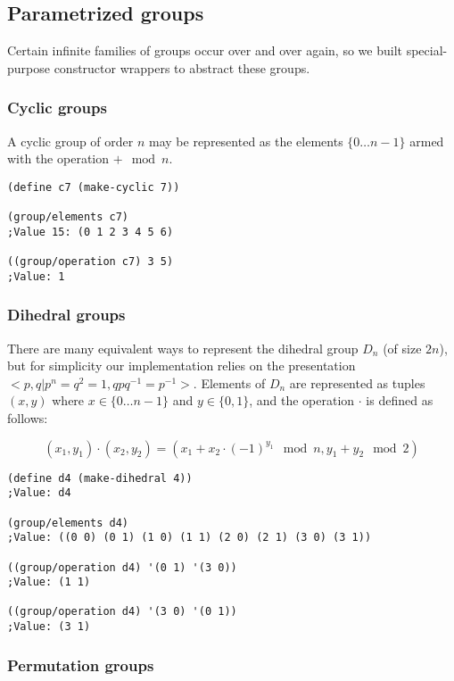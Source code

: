 \documentclass{article}
\begin{document}
        \subsection{Parametrized groups}
        
        Certain infinite families of groups occur over and over again, so we built special-purpose constructor wrappers to abstract these groups.
        
        \subsubsection{Cyclic groups}
        
        A cyclic group of order $n$ may be represented as the elements $\{0 \ldots n-1\}$ armed with the operation $+ \mod n$.
        
\begin{verbatim}         
(define c7 (make-cyclic 7))

(group/elements c7)
;Value 15: (0 1 2 3 4 5 6)

((group/operation c7) 3 5)
;Value: 1
\end{verbatim}
        
        \subsubsection{Dihedral groups}
        
        There are many equivalent ways to represent the dihedral group $D_n$ (of size $2n$), but for simplicity our implementation relies on the presentation $<p,q|p^n = q^2 = 1, qpq^{-1} = p^{-1}>$. Elements of $D_n$ are represented as tuples $(x,y)$ where $x \in \{ 0 \ldots n-1\}$ and $y \in \{0, 1\}$, and the operation $\cdot$ is defined as follows:
        
        $$(x_1,y_1) \cdot (x_2,y_2) = (x_1 + x_2 \cdot (-1)^{y_1} \mod n, y_1 + y_2 \mod 2)$$
        
\begin{verbatim}
(define d4 (make-dihedral 4))
;Value: d4

(group/elements d4)
;Value: ((0 0) (0 1) (1 0) (1 1) (2 0) (2 1) (3 0) (3 1))

((group/operation d4) '(0 1) '(3 0))
;Value: (1 1)

((group/operation d4) '(3 0) '(0 1))
;Value: (3 1)
\end{verbatim}
        
        \subsubsection{Permutation groups}
        
\end{document}
